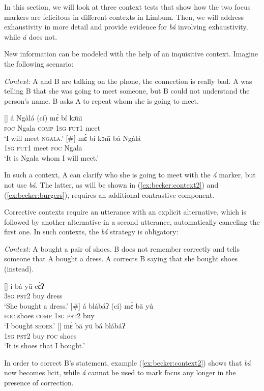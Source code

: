 \documentclass[output=paper,
modfonts
]{langscibook}
\begin{document}
\noindent
In this section, we will look at three context tests that show how the two focus markers are felicitous in different contexts in Limbum. Then, we will address exhaustivity in more detail and provide evidence for \textit{bá} involving exhaustivity, while \textit{á} does not.

New information can be modeled with the help of an inquisitive context. Imagine the following scenario:

\begin{exe}
\ex
\textit{Context:} A and B are talking on the phone, the connection is really bad. A was telling B that she was going to meet someone, but B could not understand the person's name. B asks A to repeat whom she is going to meet.\label{ex:becker:context1}
\begin{xlist}
[]{
\gll á Ngàlá  (cí) m\`ɛ bí k\=ɔn\={\i} \\
\textsc{foc} Ngala \textsc{comp} \textsc{1sg} \textsc{fut1} meet \\
\glt `I will meet \textsc{\MakeLowercase{NGALA}}.'}
[\#]{
\gll m\`ɛ bí kɔn\={\i} bá Ngàlá\\
\textsc{1sg} \textsc{fut1} meet \textsc{foc} Ngala \\
\glt `It is Ngala whom I will meet.'}
\end{xlist}
\end{exe}

\noindent 
In such a context, A can clarify who she is going to meet with the \textit{á} marker, but not use \textit{bá}. The latter, as will be shown in (\ref{ex:becker:context2}) and (\ref{ex:becker:burgers}), requires an additional contrastive component.

Corrective contexts require an utterance with an explicit alternative, which is followed by another alternative in a second utterance, automatically canceling the first one. In such contexts, the \textit{bá} strategy is obligatory:

\begin{exe}
\ex
\textit{Context:} A bought a pair of shoes. B does not remember correctly and tells someone that A bought a dress. A corrects B saying that she bought shoes (instead). 
\label{ex:becker:context2}
\begin{xlist}
[]{
\gll \'i b\'a y\=u c\`ɛʔ\\
 	\textsc{3sg} \textsc{pst2} buy dress\\
\glt `She bought a dress.'\label{ex:becker:7B}}
[\#]{
\gll \'a bl\'ab\'aʔ (c\'i) m\`ɛ b\=a y\'u \\
\textsc{foc} shoes \textsc{comp} \textsc{1sg} \textsc{pst2} buy\\
\glt `I bought \textsc{\MakeLowercase{SHOES}}.'}
[]{
\gll m\`ɛ b\=a y\=u b\'a bl\'ab\'aʔ\\
\textsc{1sg} \textsc{pst2} buy  \textsc{foc} shoes\\
\glt `It is shoes that I bought.' }
\end{xlist}
\end{exe}
In order to correct B's statement, example (\ref{ex:becker:context2}) shows that \textit{bá} now becomes licit, while \textit{á} cannot be used to mark focus any longer in the presence of correction.
\end{document}

